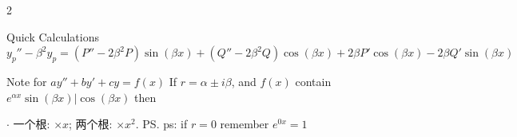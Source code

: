 \documentclass{note}
\begin{document}
\begin{multicols}{2}
{{\begin{MyTh}{Quick Calculations}
        \quad $y_p'' - \beta^2 y_p = (P'' - 2\beta^2 P)\sin(\beta x) + (Q'' - 2\beta^2 Q)\cos(\beta x) + 2\beta P' \cos(\beta x) - 2\beta Q' \sin(\beta x)$
    \end{MyTh}

    \begin{MyTh}{Note for $ay''+by'+cy=f(x)$}
        If $r=\alpha \pm i\beta$, and $f(x)$ contain $e^{\alpha x}\sin(\beta x)|\cos(\beta x)$ then

        \quad $\cdot$ 一个根: $\times x$; 两个根: $\times x^2$. \quad \ps{ps: if $r=0$ remember $e^{0x}=1$}
        
    \end{MyTh}


    }}


\end{multicols}
\end{document}
